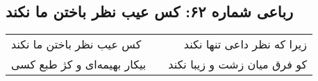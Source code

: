 \begin{center}
\section*{رباعی شماره ۶۲: کس عیب نظر باختن ما نکند}
\label{sec:062}
\begin{longtable}{l p{0.5cm} r}
کس عیب نظر باختن ما نکند
&&
زیرا که نظر داعی تنها نکند
\\
بیکار بهیمه‌ای و کژ طبع کسی
&&
کو فرق میان زشت و زیبا نکند
\\
\end{longtable}
\end{center}
